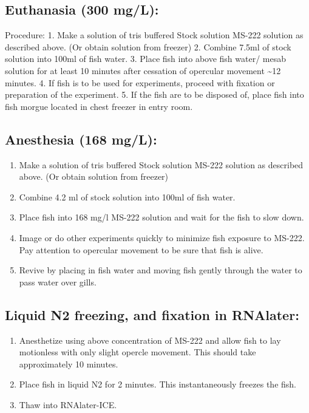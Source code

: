 \documentclass[
]{book}
\providecommand{\tightlist}{%
  \setlength{\itemsep}{0pt}\setlength{\parskip}{0pt}}
\begin{document}
\hypertarget{euthanasia-300-mgl}{%
\subsection{Euthanasia (300 mg/L):}\label{euthanasia-300-mgl}}

Procedure:
1. Make a solution of tris buffered Stock solution MS-222 solution as described above. (Or obtain solution from freezer)
2. Combine 7.5ml of stock solution into 100ml of fish water.
3. Place fish into above fish water/ mesab solution for at least 10 minutes after cessation of opercular movement \textasciitilde12 minutes.
4. If fish is to be used for experiments, proceed with fixation or preparation of the experiment.
5. If the fish are to be disposed of, place fish into fish morgue located in chest freezer in entry room.

\hypertarget{anesthesia-168-mgl}{%
\subsection{Anesthesia (168 mg/L):}\label{anesthesia-168-mgl}}

\begin{enumerate}
\def\labelenumi{\arabic{enumi}.}
\tightlist
\item
  Make a solution of tris buffered Stock solution MS-222 solution as described above. (Or obtain solution from freezer)
\item
  Combine 4.2 ml of stock solution into 100ml of fish water.
\item
  Place fish into 168 mg/l MS-222 solution and wait for the fish to slow down.
\item
  Image or do other experiments quickly to minimize fish exposure to MS-222. Pay attention to opercular movement to be sure that fish is alive.
\item
  Revive by placing in fish water and moving fish gently through the water to pass water over gills.
\end{enumerate}

\hypertarget{liquid-n2-freezing-and-fixation-in-rnalater}{%
\subsection{Liquid N2 freezing, and fixation in RNAlater:}\label{liquid-n2-freezing-and-fixation-in-rnalater}}

\begin{enumerate}
\def\labelenumi{\arabic{enumi}.}
\tightlist
\item
  Anesthetize using above concentration of MS-222 and allow fish to lay motionless with only slight opercle movement. This should take approximately 10 minutes.
\item
  Place fish in liquid N2 for 2 minutes. This instantaneously freezes the fish.
\item
  Thaw into RNAlater-ICE.
\end{enumerate}
\end{document}
